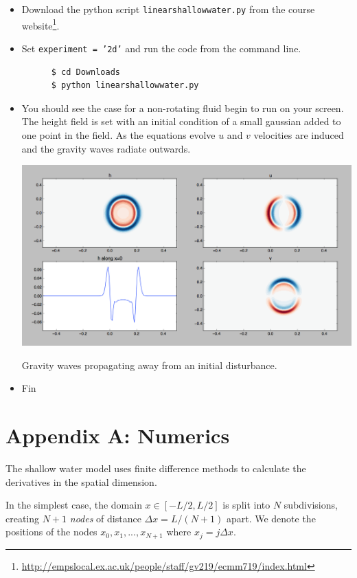 \documentclass[a4paper]{tufte-handout}
\begin{document}
  \begin{itemize}
    \item Download the python script \texttt{linearshallowwater.py} from the
    course website\footnote{\url{http://empslocal.ex.ac.uk/people/staff/gv219/ecmm719/index.html}}.
    \item Set \texttt{experiment = '2d'} and run the code from the command line.
    \begin{verbatim}
      $ cd Downloads
      $ python linearshallowwater.py
    \end{verbatim}
    \item You should see the case for a non-rotating fluid begin to run on
    your screen.  The height field is set with an initial condition of a small
    gaussian added to one point in the field.  As the equations evolve $u$ and
    $v$ velocities are induced and the gravity waves radiate outwards.
    \begin{marginfigure}
      \includegraphics{gravity_waves}
      \caption{Gravity waves propagating away from an initial disturbance.}
      \label{fig:gravwaves}
    \end{marginfigure}
    \item Fin
  \end{itemize}

  \section{Appendix A: Numerics}
  \label{sec:appendixa}

  \noindent The shallow water model uses finite difference methods to calculate
  the derivatives in the spatial dimension.

  In the simplest case, the domain $x \in [-L/2, L/2]$ is split into $N$
  subdivisions, creating $N+1$ \emph{nodes} of distance $\Delta x = L/(N+1)$ apart.
  We denote the positions of the nodes $x_0, x_1, ..., x_{N+1}$ where $x_j = j \Delta x$.
\end{document}
